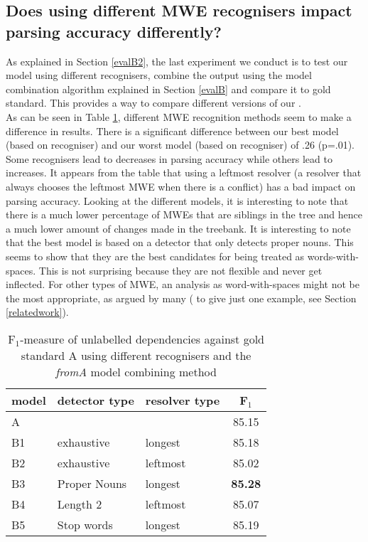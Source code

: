 \documentclass[output=paper]{LSP/langsci}
\begin{document}
\subsection{Does using different MWE recognisers impact parsing accuracy differently?}
\label{q2}
\indent As explained in Section \ref{evalB2}, the last experiment we conduct is to test our model using different recognisers, combine the output using the model combination algorithm explained in Section \ref{evalB} and compare it to gold standard. This provides a way to compare different versions of our \modelB.\\	
\indent As can be seen in Table \ref{tab:res3}, different MWE recognition methods seem to make a difference in results. There is a significant difference between our best model (based on recogniser) and our worst model (based on recogniser) of .26 (p=.01). Some recognisers lead to decreases in parsing accuracy while others lead to increases. It appears from the table that using a leftmost resolver (a resolver that always chooses the leftmost MWE when there is a conflict) has a bad impact on parsing accuracy. Looking at the different models, it is interesting to note that there is a much lower percentage of MWEs that are siblings in the tree and hence a much lower amount of changes made in the treebank. It is interesting to note that the best model is based on a detector that only detects proper nouns. This seems to show that they are the best candidates for being treated as words-with-spaces. This is not surprising because they are not flexible and never get inflected. For other types of MWE, an analysis as word-with-spaces might not be the most appropriate, as argued by many (\citet{sag02} to give just one example, see Section \ref{relatedwork}).

\begin{table}[H]
    \footnotesize
    \def\arraystretch{1.20} 
    \centering
    \begin{tabular}{| l | l | l | c |} \hline
        \textbf{model}
        & \textbf{detector type}
        & \textbf{resolver type}
        & \textbf{F$_1$}
        \\ \hline
        A &  &  & 85.15\\ \hline
        B1 & exhaustive & longest & 85.18 \\
        B2 & exhaustive & leftmost & 85.02 \\
        B3 & Proper Nouns & longest & \textbf{85.28} \\
        B4 & Length 2 & leftmost & 85.07 \\
        B5 & Stop words & longest & 85.19 \\
        \hline
    \end{tabular}
    \caption{F$_1$-measure of unlabelled dependencies against gold standard A using different recognisers and the \textit{fromA} model combining method\label{tab:res3}}
\end{table}
\end{document}
